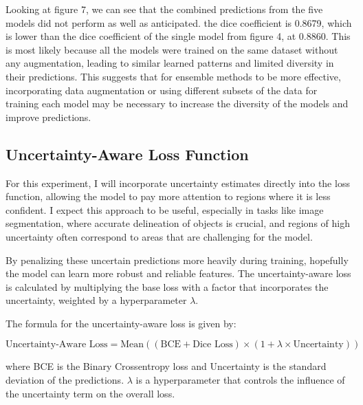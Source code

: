 \documentclass{article}
\begin{document}
\vspace{1em}
Looking at figure 7, we can see that the combined predictions from the five models did not perform as well as anticipated. 
the dice coefficient is 0.8679, which is lower than the dice coefficient of the single model from figure 4, at 0.8860.
This is most likely because all the models were trained on the same dataset without any augmentation, leading to similar 
learned patterns and limited diversity in their predictions. This suggests that for ensemble methods to be more effective, 
incorporating data augmentation or using different subsets of the data for training each model may be necessary to increase 
the diversity of the models and improve predictions.

\subsection{Uncertainty-Aware Loss Function}

For this experiment, I will incorporate uncertainty estimates directly into the loss function, allowing the model 
to pay more attention to regions where it is less confident. I expect this approach to be useful, especially in tasks like 
image segmentation, where accurate delineation of objects is crucial, and regions of high uncertainty often correspond to 
areas that are challenging for the model.
\vspace{1em}

By penalizing these uncertain predictions more heavily during training, hopefully the model can learn more robust 
and reliable features. The uncertainty-aware loss is calculated by multiplying the base loss with a factor that 
incorporates the uncertainty, weighted by a hyperparameter \(\lambda\).

The formula for the uncertainty-aware loss is given by:

\[
\text{Uncertainty-Aware Loss} = \text{Mean} \left( (\text{BCE} + \text{Dice Loss}) \times (1 + \lambda \times \text{Uncertainty}) \right)
\]

where BCE is the Binary Crossentropy loss and Uncertainty is the standard deviation of the predictions. 
\(\lambda\) is a hyperparameter that controls the influence of the uncertainty term on the overall loss.
\end{document}
